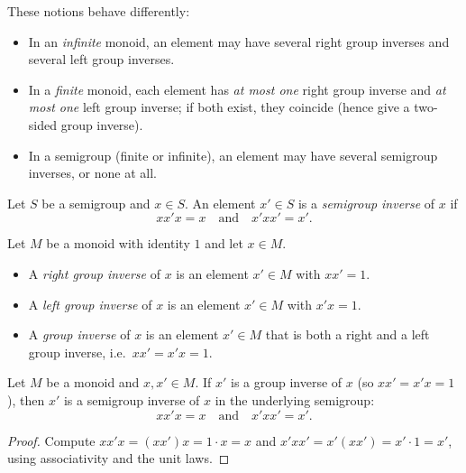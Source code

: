 These notions behave differently:
\begin{itemize}
  \item In an \emph{infinite} monoid, an element may have several right group inverses and several left group inverses.
  \item In a \emph{finite} monoid, each element has \emph{at most one} right group inverse and \emph{at most one} left group inverse; if both exist, they coincide (hence give a two-sided group inverse).
  \item In a semigroup (finite or infinite), an element may have several semigroup inverses, or none at all.
\end{itemize}

\begin{definition}
\label{def:semigroup-inverse}
Let \(S\) be a semigroup and \(x\in S\). An element \(x'\in S\) is a \emph{semigroup inverse} of \(x\) if
\[
x x' x = x \quad\text{and}\quad x' x x' = x'.
\]
\end{definition}

\begin{definition}
\label{def:group-inverse}
Let \(M\) be a monoid with identity \(1\) and let \(x\in M\).
\begin{itemize}
  \item A \emph{right group inverse} of \(x\) is an element \(x'\in M\) with \(x x' = 1\).
  \item A \emph{left group inverse} of \(x\) is an element \(x'\in M\) with \(x' x = 1\).
  \item A \emph{group inverse} of \(x\) is an element \(x'\in M\) that is both a right and a left group inverse, i.e.\ \(x x' = x' x = 1\).
\end{itemize}
\end{definition}

\begin{lemma}
\label{lem:group-inverse-implies-semigroup-inverse}
Let \(M\) be a monoid and \(x,x'\in M\). If \(x'\) is a group inverse of \(x\) (so \(x x' = x' x = 1\)), then \(x'\) is a semigroup inverse of \(x\) in the underlying semigroup:
\[
x x' x = x \quad\text{and}\quad x' x x' = x'.
\]
\end{lemma}
\begin{proof}
Compute \(x x' x = (x x') x = 1\cdot x = x\) and \(x' x x' = x' (x x') = x' \cdot 1 = x'\), using associativity and the unit laws.
\end{proof}
